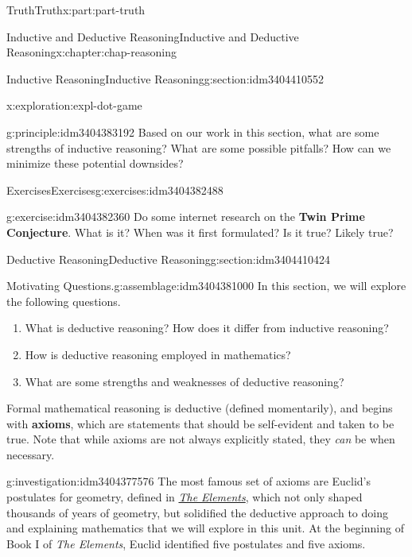 \documentclass[oneside,10pt,]{book}
\newcommand{\terminology}[1]{\textbf{#1}}
\numberwithin{equation}{section}
\begin{document}
\begin{partptx}{Truth}{}{Truth}{}{}{x:part:part-truth}
\begin{chapterptx}{Inductive and Deductive Reasoning}{}{Inductive and Deductive Reasoning}{}{}{x:chapter:chap-reasoning}
\begin{sectionptx}{Inductive Reasoning}{}{Inductive Reasoning}{}{}{g:section:idm3404410552}
\begin{exploration}{}{x:exploration:expl-dot-game}
\begin{enumerate}
\end{enumerate}
\end{exploration}%
\begin{principle}{}{}{g:principle:idm3404383192}%
Based on our work in this section, what are some strengths of inductive reasoning? What are some possible pitfalls? How can we minimize these potential downsides?%
\end{principle}
%
%
\typeout{************************************************}
\typeout{************************************************}
%
\begin{exercises-subsection-numberless}{Exercises}{}{Exercises}{}{}{g:exercises:idm3404382488}
\begin{divisionexercise}{1}{}{}{g:exercise:idm3404382360}%
Do some internet research on the \terminology{Twin Prime Conjecture}. What is it? When was it first formulated? Is it true? Likely true?%
\end{divisionexercise}%
\end{exercises-subsection-numberless}
\end{sectionptx}
%
%
\typeout{************************************************}
\typeout{************************************************}
%
\begin{sectionptx}{Deductive Reasoning}{}{Deductive Reasoning}{}{}{g:section:idm3404410424}
\begin{assemblage}{Motivating Questions.}{g:assemblage:idm3404381000}%
In this section, we will explore the following questions. %
\begin{enumerate}
\item{}What is deductive reasoning? How does it differ from inductive reasoning?%
\item{}How is deductive reasoning employed in mathematics?%
\item{}What are some strengths and weaknesses of deductive reasoning?%
\end{enumerate}
%
\end{assemblage}
Formal mathematical reasoning is deductive (defined momentarily), and begins with \terminology{axioms}, which are statements that should be self-evident and taken to be true. Note that while axioms are not always explicitly stated, they \emph{can} be when necessary.%
\begin{investigation}{}{g:investigation:idm3404377576}%
The most famous set of axioms are Euclid's postulates for geometry, defined in \emph{\href{https://en.wikipedia.org/wiki/Euclid's_Elements}{The Elements}}, which not only shaped thousands of years of geometry, but solidified the deductive approach to doing and explaining mathematics that we will explore in this unit. At the beginning of Book I of \emph{The Elements}, Euclid identified five postulates and five axioms.%

\end{investigation}
\end{sectionptx}
\end{chapterptx}
\end{partptx}
\end{document}
